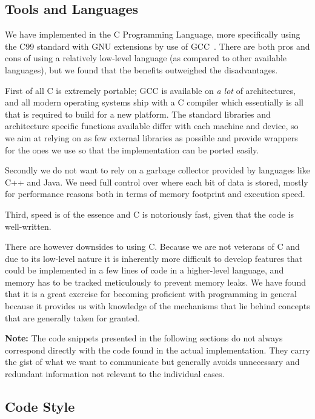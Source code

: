 \subsection{Tools and Languages}

We have implemented \thename{} in the C Programming Language, more specifically
using the C99 standard with GNU extensions by use of GCC~\cite{gnu:gcc}. There
are both pros and cons of using a relatively low-level language (as compared to
other available languages), but we found that the benefits outweighed the
disadvantages.

First of all C is extremely portable; GCC is available on \textit{a lot} of
architectures, and all modern operating systems ship with a C compiler which
essentially is all that is required to build \thename{} for a new platform. The
standard libraries and architecture specific functions available differ with
each machine and device, so we aim at relying on as few external libraries as
possible and provide wrappers for the ones we use so that the implementation can
be ported easily.

Secondly we do not want to rely on a garbage collector provided by languages
like C++ and Java. We need full control over where each bit of data is stored,
mostly for performance reasons both in terms of memory footprint and execution
speed.

Third, speed is of the essence and C is notoriously fast, given that the code is
well-written.

There are however downsides to using C. Because we are not veterans of C and due
to its low-level nature it is inherently more difficult to develop features that
could be implemented in a few lines of code in a higher-level language, and
memory has to be tracked meticulously to prevent memory leaks. We have found
that it is a great exercise for becoming proficient with programming in general
because it provides us with knowledge of the mechanisms that lie behind concepts
that are generally taken for granted.

\textbf{Note:} The code snippets presented in the following sections do not
always correspond directly with the code found in the actual
implementation. They carry the gist of what we want to communicate but generally
avoids unnecessary and redundant information not relevant to the individual
cases.

\subsection{Code Style}

